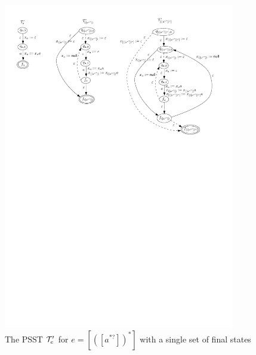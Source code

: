 \begin{example}
%
	\begin{figure}[tb]
		\centering
		\includegraphics[width=0.9\textwidth]{psst-partition.pdf}
		\caption{The PSST $\mathcal{T}^\prime_e$ for $e = [([a^{*?}])^{*}]$ with a single set of final states}
		\label{fig-psst-partition}
		\vspace{-4mm}
	\end{figure}
\end{example}



